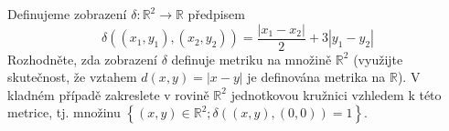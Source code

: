 Definujeme zobrazení $\delta : \mathbb{R}^{2}\rightarrow \mathbb{R}$ předpisem
$$\delta ((x_{1},y_{1}),(x_{2},y_{2}))=\frac{\left | x_{1}-x_{2} \right
|}{2}+3\left | y_{1}-y_{2} \right |$$
Rozhodněte, zda zobrazení $\delta$ definuje metriku na množině $\mathbb{R}^2$
(využijte skutečnost, že vztahem $d(x,y) = \left | x-y \right |$ je definována
metrika na $\mathbb{R}$). V kladném případě zakreslete v rovině $\mathbb{R}^2$
jednotkovou kružnici vzhledem k této metrice, tj. množinu $\left \{ \left ( x,y
\right ) \in \mathbb{R}^{2};\delta((x,y),(0,0))=1\right \}$.
